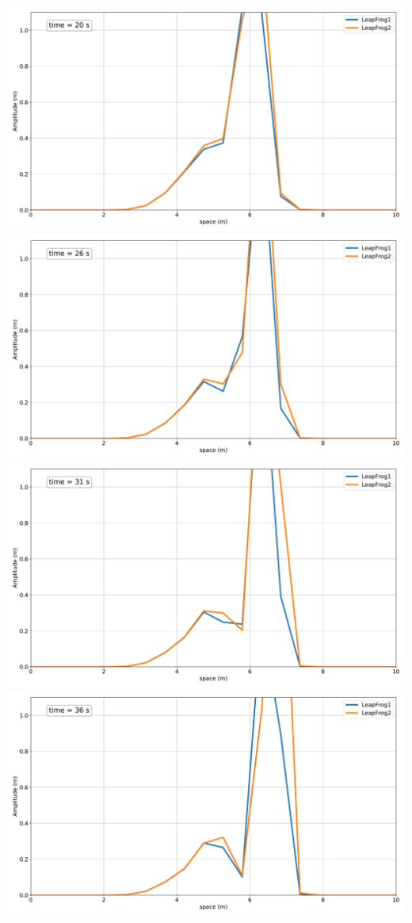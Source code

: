 \includegraphics[width=\linewidth]{../BurgersEquation/images/Lin3_Lin44.pdf}
\includegraphics[width=\linewidth]{../BurgersEquation/images/Lin3_Lin45.pdf}
\includegraphics[width=\linewidth]{../BurgersEquation/images/Lin3_Lin46.pdf}
\includegraphics[width=\linewidth]{../BurgersEquation/images/Lin3_Lin47.pdf}
